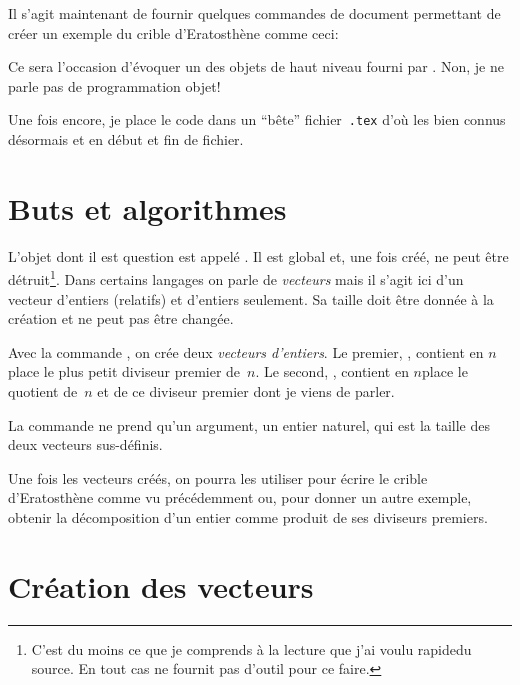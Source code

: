 
Il s'agit maintenant de fournir quelques commandes de document permettant de
créer un exemple du crible d'Eratosthène comme ceci:
\begin{center}\label{lecrible100}
\end{center}

Ce sera l'occasion d'évoquer un des \og objets de haut niveau\fg
fourni par \Expliii. Non, je ne parle pas de programmation objet!

Une fois encore, je place le code dans un ``bête''
fichier~\texttt{.tex} d'où les bien connus désormais
 et  en début et fin de
fichier.

\section{Buts et algorithmes}
\label{sec:butsalgo}

L'objet dont il est question est appelé . Il est
global et, une fois créé, ne peut être détruit\footnote{C'est du moins
  ce que je comprends à la lecture \TO que j'ai voulu rapide\TF du
  source. En tout cas \Expliii ne fournit pas d'outil pour ce
  faire.}. Dans certains langages on parle de \emph{vecteurs} mais il
s'agit ici d'un vecteur d'\glspl{entier} (relatifs) et d'entiers
seulement.  Sa taille doit être donnée à la création et ne peut pas
être changée.

Avec la commande , on crée deux \emph{vecteurs
  d'entiers}. Le premier, , contient en \(n\)\ieme
place le plus petit diviseur premier de~\(n\). Le second,
, contient en \(n\)\ieme place le quotient de~\(n\)
et de ce diviseur premier dont je viens de parler.

La commande   ne prend qu'un argument, un entier
naturel, qui est la taille des deux vecteurs sus-définis.

Une fois les vecteurs créés, on pourra les utiliser pour écrire le
crible d'Eratosthène comme vu précédemment ou, pour donner un autre
exemple, obtenir la décomposition d'un entier comme produit de ses
diviseurs premiers.

\section{Création des vecteurs}
\label{sec:creationvecteurs}

